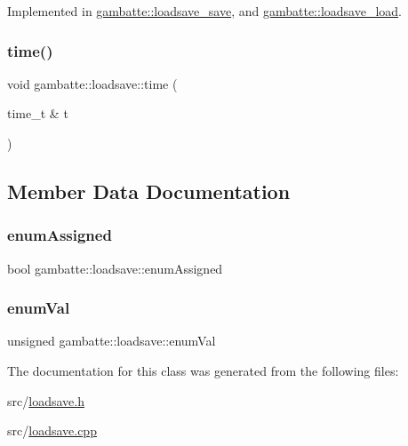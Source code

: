 Implemented in \hyperlink{classgambatte_1_1loadsave__save_a38e0327b81d707e1037e3f3ad523ffab}{gambatte\+::loadsave\+\_\+save}, and \hyperlink{classgambatte_1_1loadsave__load_a85b86aaebae87da4bead8d3ed4ac3a9c}{gambatte\+::loadsave\+\_\+load}.

\mbox{\label{classgambatte_1_1loadsave_a408680c3fae9e459f3dc4d2e9c6eef04}} 
\subsubsection{\texorpdfstring{time()}{time()}}
{\footnotesize\ttfamily void gambatte\+::loadsave\+::time (\begin{DoxyParamCaption}\item[{time\+\_\+t \&}]{t }\end{DoxyParamCaption})\hspace{0.3cm}{\ttfamily [inline]}}



\subsection{Member Data Documentation}
\mbox{\label{classgambatte_1_1loadsave_a7c680a9fcfcffab3f7cdb137125830f7}} 
\subsubsection{\texorpdfstring{enum\+Assigned}{enumAssigned}}
{\footnotesize\ttfamily bool gambatte\+::loadsave\+::enum\+Assigned\hspace{0.3cm}{\ttfamily [private]}}

\mbox{\label{classgambatte_1_1loadsave_a4879654f0e5d4751b6ff6797778f3247}} 
\subsubsection{\texorpdfstring{enum\+Val}{enumVal}}
{\footnotesize\ttfamily unsigned gambatte\+::loadsave\+::enum\+Val\hspace{0.3cm}{\ttfamily [private]}}



The documentation for this class was generated from the following files\+:\begin{DoxyCompactItemize}
\item 
src/\hyperlink{loadsave_8h}{loadsave.\+h}\item 
src/\hyperlink{loadsave_8cpp}{loadsave.\+cpp}\end{DoxyCompactItemize}
